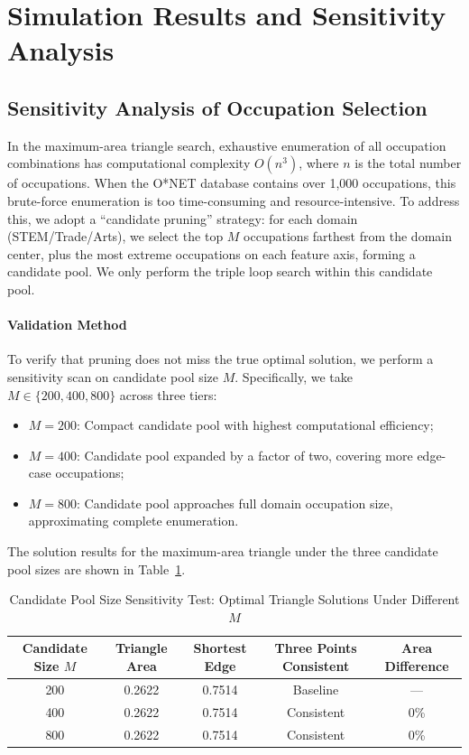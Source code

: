 \section{Simulation Results and Sensitivity Analysis}

\subsection{Sensitivity Analysis of Occupation Selection}

In the maximum-area triangle search, exhaustive enumeration of all occupation combinations has computational complexity $O(n^3)$, where $n$ is the total number of occupations. When the O*NET database contains over 1,000 occupations, this brute-force enumeration is too time-consuming and resource-intensive. To address this, we adopt a ``candidate pruning'' strategy: for each domain (STEM/Trade/Arts), we select the top $M$ occupations farthest from the domain center, plus the most extreme occupations on each feature axis, forming a candidate pool. We only perform the triple loop search within this candidate pool.

\paragraph{Validation Method}
To verify that pruning does not miss the true optimal solution, we perform a sensitivity scan on candidate pool size $M$. Specifically, we take $M\in\{200,400,800\}$ across three tiers:
\begin{itemize}
    \item $M=200$: Compact candidate pool with highest computational efficiency;
    \item $M=400$: Candidate pool expanded by a factor of two, covering more edge-case occupations;
    \item $M=800$: Candidate pool approaches full domain occupation size, approximating complete enumeration.
\end{itemize}

The solution results for the maximum-area triangle under the three candidate pool sizes are shown in Table~\ref{tab:sensitivity_M}.

\begin{table}[H]
\centering
\caption{Candidate Pool Size Sensitivity Test: Optimal Triangle Solutions Under Different $M$}
\label{tab:sensitivity_M}
\begin{tabular}{@{}ccccc@{}}
\toprule
Candidate Size $M$ & Triangle Area & Shortest Edge & Three Points Consistent & Area Difference \\
\midrule
200 & 0.2622 & 0.7514 & Baseline & --- \\
400 & 0.2622 & 0.7514 & Consistent & 0\% \\
800 & 0.2622 & 0.7514 & Consistent & 0\% \\
\bottomrule
\end{tabular}
\end{table}

